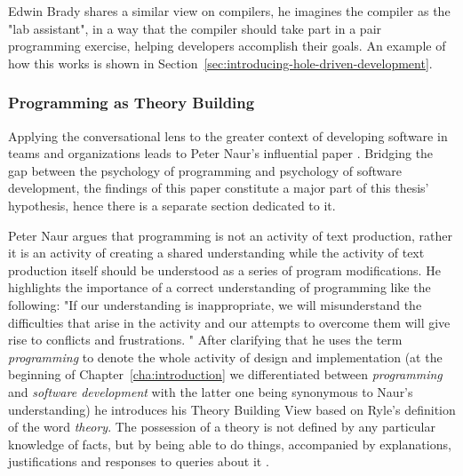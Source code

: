 Edwin Brady shares a similar view on compilers, he imagines the compiler as the "lab assistant", in a way that the compiler should take part in a pair programming exercise, helping developers accomplish their goals.
An example of how this works is shown in Section~\ref{sec:introducing-hole-driven-development}.


\subsubsection{Programming as Theory Building}
\label{sec:programming-as-theory-building}
Applying the conversational lens to the greater context of developing software in teams and organizations leads to Peter Naur's influential paper .
Bridging the gap between the psychology of programming and psychology of software development, the findings of this paper constitute a major part of this thesis' hypothesis, hence there is a separate section dedicated to it.

Peter Naur argues that programming is not an activity of text production, rather it is an activity of creating a shared understanding while the activity of text production itself should be understood as a series of program modifications.
He highlights the importance of a correct understanding of programming like the following: "If our understanding is inappropriate, we will misunderstand the difficulties that arise in the activity and our attempts to overcome them will give rise to conflicts and frustrations. \cite{naur_programming_1985}"
After clarifying that he uses the term \emph{programming} to denote the whole activity of design and implementation (at the beginning of Chapter~\ref{cha:introduction} we differentiated between \emph{programming} and \emph{software development} with the latter one being synonymous to Naur's understanding) he introduces his Theory Building View based on Ryle's definition of the word \emph{theory}\addref.
The possession of a theory is not defined by any particular knowledge of facts, but by being able to do things, accompanied by explanations, justifications and responses to queries about it \cite{barn_revisiting_2011}.

